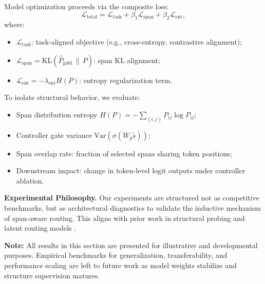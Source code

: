 Model optimization proceeds via the composite loss:
\begin{equation}
\mathcal{L}_{\text{total}} = \mathcal{L}_{\text{task}} + \beta_1 \mathcal{L}_{\text{span}} + \beta_2 \mathcal{L}_{\text{ent}},
\label{eq:exp_loss_summary}
\end{equation}
where:
\begin{itemize}[leftmargin=1.8em]
    \item \(\mathcal{L}_{\text{task}}\): task-aligned objective (e.g., cross-entropy, contrastive alignment);
    \item \(\mathcal{L}_{\text{span}} = \mathrm{KL}(\hat{P}_{\text{gold}} \,\|\, P)\): span KL alignment;
    \item \(\mathcal{L}_{\text{ent}} = - \lambda_{\text{ent}} H(P)\): entropy regularization term.
\end{itemize}

To isolate structural behavior, we evaluate:
\begin{itemize}
  \item Span distribution entropy \(H(P) = -\sum_{(i,j)} P_{ij} \log P_{ij}\);
  \item Controller gate variance \(\mathrm{Var}(\sigma(W_g \tilde{s}))\);
  \item Span overlap rate: fraction of selected spans sharing token positions;
  \item Downstream impact: change in token-level logit outputs under controller ablation.
\end{itemize}

\vspace{0.5em}
\noindent\textbf{Experimental Philosophy.}
Our experiments are structured not as competitive benchmarks, but as architectural diagnostics to validate the inductive mechanism of span-aware routing. This aligns with prior work in structural probing and latent routing models \cite{gupta2022molt, tay2020sparse, clark2018semi}.

\vspace{0.75em}
\textbf{Note:} All results in this section are presented for illustrative and developmental purposes. Empirical benchmarks for generalization, transferability, and performance scaling are left to future work as model weights stabilize and structure supervision matures.








